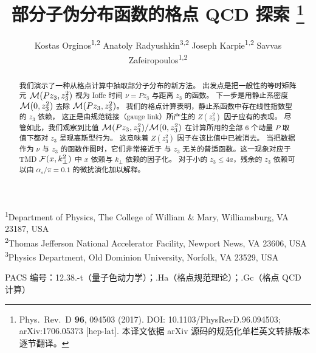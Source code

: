 \documentclass[11pt]{ctexart}
\title{\bfseries 部分子伪分布函数的格点 QCD 探索%
\thanks{Phys.\ Rev.\ D {\bf 96}, 094503 (2017).
DOI: 10.1103/PhysRevD.96.094503; arXiv:1706.05373 [hep-lat].
本译文依据 arXiv 源码的规范化单栏英文转排版本逐节翻译。}}
\author{Kostas Orginos\textsuperscript{1,2}\quad
        Anatoly Radyushkin\textsuperscript{3,2}\quad
        Joseph Karpie\textsuperscript{1,2}\quad
        Savvas Zafeiropoulos\textsuperscript{1,2}}
\date{}
\begin{document}
\maketitle

\begin{center}\small
\textsuperscript{1}Department of Physics, The College of William \& Mary,
Williamsburg, VA 23187, USA\\
\textsuperscript{2}Thomas Jefferson National Accelerator Facility,
Newport News, VA 23606, USA\\
\textsuperscript{3}Physics Department, Old Dominion University,
Norfolk, VA 23529, USA
\end{center}

\begin{center}\small
PACS 编号：12.38.-t（量子色动力学）；.Ha（格点规范理论）；.Gc（格点 QCD 计算）
\end{center}

\begin{abstract}
\noindent
我们演示了一种从格点计算中抽取部分子分布的新方法。
出发点是把一般性的等时矩阵元 ${\cal M} (Pz_3, z_3^2)$ 视为
Ioffe 时间 $\nu = Pz_3$ 与距离 $z_3$ 的函数。
下一步是用静止系密度 ${\cal M} (0, z_3^2)$ 去除 ${\cal M} (Pz_3, z_3^2)$。
我们的格点计算表明，静止系函数中存在线性指数型的 $z_3$ 依赖，
这正是由规范链接（gauge link）所产生的 $Z(z_3^2)$ 因子应有的表现。
尽管如此，我们观察到比值 ${\cal M} (Pz_3 , z_3^2)/{\cal M} (0, z_3^2)$
在计算所用的全部 6 个动量 $P$ 取值下都对 $z_3$ 呈现高斯型行为。
这意味着 $Z(z_3^2)$ 因子在该比值中已被消去。
当把数据作为 $\nu$ 与 $z_3$ 的函数作图时，它们非常接近于
与 $z_3$ 无关的普适函数。这一现象对应于
TMD ${\cal F} (x, k_\perp^2)$ 中 $x$ 依赖与 $k_\perp$ 依赖的因子化。
对于小的 $z_3 \leq 4a$，残余的 $z_3$ 依赖可以由
$\alpha_s/\pi =0.1$ 的微扰演化加以解释。
\end{abstract}








\end{document}
